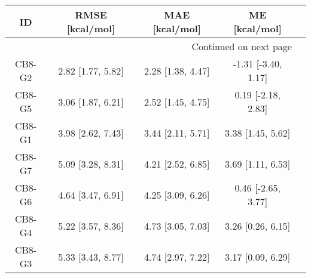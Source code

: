 \documentclass[8pt]{article}
\begin{document}
\begin{center}
\begin{footnotesize}
\begin{longtable}{|ccccc|}
\toprule
     ID &    RMSE [kcal/mol] &     MAE [kcal/mol] &        ME [kcal/mol] \\
\midrule
\endhead
\midrule
\multicolumn{4}{r}{{Continued on next page}} \\
\midrule
\endfoot

\bottomrule
\endlastfoot
 CB8-G2 &  2.82 [1.77, 5.82] &  2.28 [1.38, 4.47] &  -1.31 [-3.40, 1.17] \\
 CB8-G5 &  3.06 [1.87, 6.21] &  2.52 [1.45, 4.75] &   0.19 [-2.18, 2.83] \\
 CB8-G1 &  3.98 [2.62, 7.43] &  3.44 [2.11, 5.71] &    3.38 [1.45, 5.62] \\
 CB8-G7 &  5.09 [3.28, 8.31] &  4.21 [2.52, 6.85] &    3.69 [1.11, 6.53] \\
 CB8-G6 &  4.64 [3.47, 6.91] &  4.25 [3.09, 6.26] &   0.46 [-2.65, 3.77] \\
 CB8-G4 &  5.22 [3.57, 8.36] &  4.73 [3.05, 7.03] &    3.26 [0.26, 6.15] \\
 CB8-G3 &  5.33 [3.43, 8.77] &  4.74 [2.97, 7.22] &    3.17 [0.09, 6.29] \\
\end{longtable}
\end{footnotesize}
\end{center}
\end{document}
